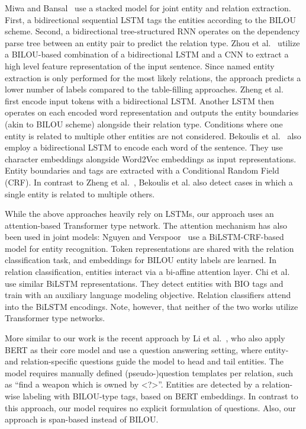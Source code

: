 \documentclass{ecai}
\begin{document}
 Miwa and Bansal~\cite{miwa:2016:stacked_rnn} use a stacked model for joint entity and relation extraction. First, a bidirectional sequential LSTM tags the entities according to the BILOU scheme. Second, a  bidirectional tree-structured RNN operates on the dependency parse tree between an entity pair to predict the relation type. Zhou et al.~\cite{zhou:2017:joint_hybrid} utilize a BILOU-based combination of a bidirectional LSTM and a CNN to extract a high level feature representation of the input sentence.
Since named entity extraction is only performed for the most likely relations, the approach predicts a lower number of labels compared to the table-filling approaches. 
Zheng et al.~\cite{zheng:2017:joint_novel_tagging} first encode input tokens with a bidirectional LSTM. Another LSTM then operates on each encoded word representation and outputs the entity boundaries (akin to BILOU scheme) alongside their relation type.
Conditions where one entity is related to multiple other entities are not considered.
Bekoulis et al.~\cite{bekoulis:2018:multi_head, bekoulis:2018:adversarial} also employ a bidirectional LSTM to encode each word of the sentence. They use character embeddings alongside Word2Vec embeddings as input representations. Entity boundaries and tags are extracted with a Conditional Random Field (CRF). In contrast to Zheng et al.~\cite{zheng:2017:joint_novel_tagging}, Bekoulis et al. also detect cases in which a single entity is related to multiple others. 

While the above approaches heavily rely on LSTMs, our approach uses an attention-based Transformer type network. The attention mechanism has also been used in joint models: Nguyen and Verspoor~\cite{nguyen:2019:biaffine_attention} use a BiLSTM-CRF-based model for entity recognition. 
Token representations are shared with the relation classification task, and embeddings for BILOU entity labels are learned. In relation classification, entities interact via a bi-affine attention layer. 
Chi et al.~\cite{chi:2019:hierarch_attention} use similar BiLSTM representations. They detect entities with BIO tags and train with an auxiliary language modeling objective. Relation classifiers
attend into the BiLSTM encodings.
Note, however, that neither of the two works utilize Transformer type networks.

More similar to our work is the recent approach by Li et al.~\cite{li:2019:joint_bert}, who also apply BERT as their core model and use a question answering setting, where entity- and relation-specific questions guide the model to head and tail entities. The model requires manually defined (pseudo-)question templates per relation, such as ``find a weapon which is owned by \textless?\textgreater''. Entities are detected by a relation-wise labeling with BILOU-type tags, based on BERT embeddings. In contrast to this approach, our model requires no explicit formulation of questions. Also, our approach is span-based instead of BILOU.
\end{document}

